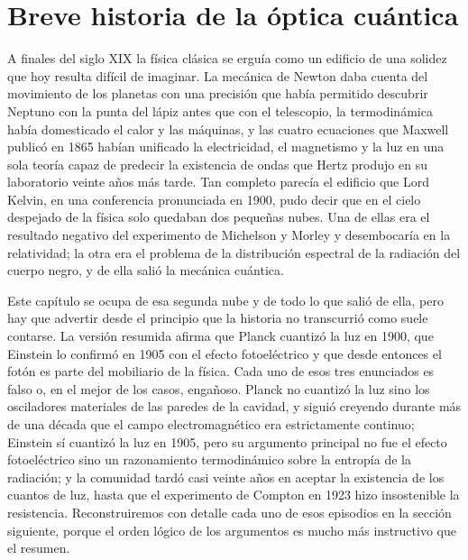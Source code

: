 \section{Breve historia de la óptica cuántica}

    A finales del siglo XIX la física clásica se erguía como un edificio de una solidez que hoy resulta difícil de imaginar. La mecánica de Newton daba cuenta del movimiento de los planetas con una precisión que había permitido descubrir Neptuno con la punta del lápiz antes que con el telescopio, la termodinámica había domesticado el calor y las máquinas, y las cuatro ecuaciones que Maxwell publicó en 1865 habían unificado la electricidad, el magnetismo y la luz en una sola teoría capaz de predecir la existencia de ondas que Hertz produjo en su laboratorio veinte años más tarde. Tan completo parecía el edificio que Lord Kelvin, en una conferencia pronunciada en 1900, pudo decir que en el cielo despejado de la física solo quedaban dos pequeñas nubes. Una de ellas era el resultado negativo del experimento de Michelson y Morley y desembocaría en la relatividad; la otra era el problema de la distribución espectral de la radiación del cuerpo negro, y de ella salió la mecánica cuántica.

    Este capítulo se ocupa de esa segunda nube y de todo lo que salió de ella, pero hay que advertir desde el principio que la historia no transcurrió como suele contarse. La versión resumida afirma que Planck cuantizó la luz en 1900, que Einstein lo confirmó en 1905 con el efecto fotoeléctrico y que desde entonces el fotón es parte del mobiliario de la física. Cada uno de esos tres enunciados es falso o, en el mejor de los casos, engañoso. Planck no cuantizó la luz sino los osciladores materiales de las paredes de la cavidad, y siguió creyendo durante más de una década que el campo electromagnético era estrictamente continuo; Einstein sí cuantizó la luz en 1905, pero su argumento principal no fue el efecto fotoeléctrico sino un razonamiento termodinámico sobre la entropía de la radiación; y la comunidad tardó casi veinte años en aceptar la existencia de los cuantos de luz, hasta que el experimento de Compton en 1923 hizo insostenible la resistencia. Reconstruiremos con detalle cada uno de esos episodios en la sección siguiente, porque el orden lógico de los argumentos es mucho más instructivo que el resumen.

